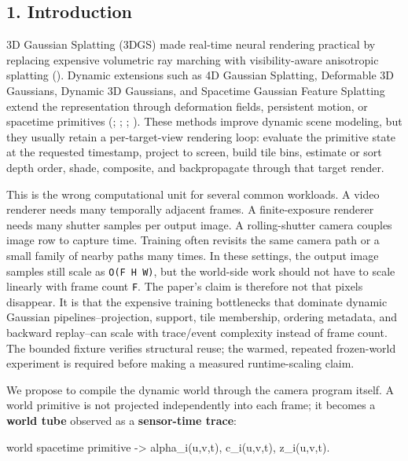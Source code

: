 \documentclass[
]{article}
\newenvironment{Shaded}{}{}
\newcommand{\NormalTok}[1]{#1}
\begin{document}
\subsection{1. Introduction}\label{introduction}

3D Gaussian Splatting (3DGS) made real-time neural rendering practical
by replacing expensive volumetric ray marching with visibility-aware
anisotropic splatting ().
Dynamic extensions such as 4D Gaussian Splatting, Deformable 3D
Gaussians, Dynamic 3D Gaussians, and Spacetime Gaussian Feature
Splatting extend the representation through deformation fields,
persistent motion, or spacetime primitives
(;
;
;
). These methods improve
dynamic scene modeling, but they usually retain a per-target-view
rendering loop: evaluate the primitive state at the requested timestamp,
project to screen, build tile bins, estimate or sort depth order, shade,
composite, and backpropagate through that target render.

This is the wrong computational unit for several common workloads. A
video renderer needs many temporally adjacent frames. A finite-exposure
renderer needs many shutter samples per output image. A rolling-shutter
camera couples image row to capture time. Training often revisits the
same camera path or a small family of nearby paths many times. In these
settings, the output image samples still scale as \texttt{O(F\ H\ W)},
but the world-side work should not have to scale linearly with frame
count \texttt{F}. The paper's claim is therefore not that pixels
disappear. It is that the expensive training bottlenecks that dominate
dynamic Gaussian pipelines--projection, support, tile membership,
ordering metadata, and backward replay--can scale with trace/event
complexity instead of frame count. The bounded fixture verifies
structural reuse; the warmed, repeated frozen-world experiment is
required before making a measured runtime-scaling claim.

We propose to compile the dynamic world through the camera program
itself. A world primitive is not projected independently into each
frame; it becomes a \textbf{world tube} observed as a
\textbf{sensor-time trace}:

\begin{Shaded}
\begin{Highlighting}[]
\NormalTok{world spacetime primitive {-}\textgreater{} alpha\_i(u,v,t), c\_i(u,v,t), z\_i(u,v,t).}
\end{Highlighting}
\end{Shaded}
\end{document}
